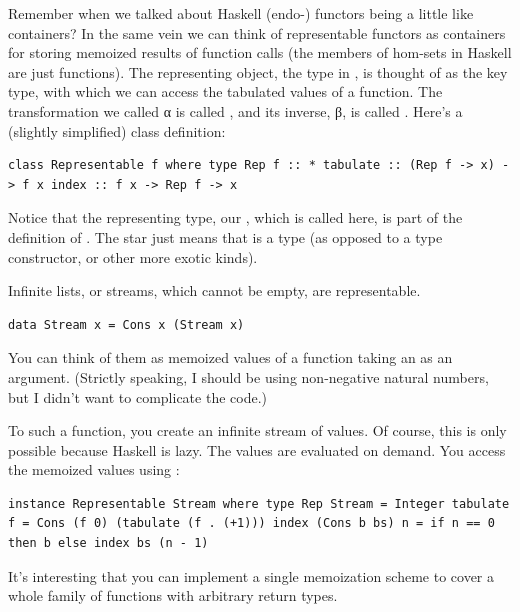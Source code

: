 Remember when we talked about Haskell (endo-) functors being a little
like containers? In the same vein we can think of representable functors
as containers for storing memoized results of function calls (the
members of hom-sets in Haskell are just functions). The representing
object, the type  in , is thought of as the
key type, with which we can access the tabulated values of a function.
The transformation we called α is called , and its
inverse, β, is called . Here's a (slightly simplified)
 class definition:

\begin{Verbatim}[commandchars=\\\{\}]
class Representable f where type Rep f :: * tabulate :: (Rep f -> x) -> f x index :: f x -> Rep f -> x
\end{Verbatim}

Notice that the representing type, our , which is called
 here, is part of the definition of
. The star just means that  is a
type (as opposed to a type constructor, or other more exotic kinds).

Infinite lists, or streams, which cannot be empty, are representable.

\begin{Verbatim}[commandchars=\\\{\}]
data Stream x = Cons x (Stream x)
\end{Verbatim}

You can think of them as memoized values of a function taking an
 as an argument. (Strictly speaking, I should be using
non-negative natural numbers, but I didn't want to complicate the code.)

To  such a function, you create an infinite stream of
values. Of course, this is only possible because Haskell is lazy. The
values are evaluated on demand. You access the memoized values using
:

\begin{Verbatim}[commandchars=\\\{\}]
instance Representable Stream where type Rep Stream = Integer tabulate f = Cons (f 0) (tabulate (f . (+1))) index (Cons b bs) n = if n == 0 then b else index bs (n - 1)
\end{Verbatim}

It's interesting that you can implement a single memoization scheme to
cover a whole family of functions with arbitrary return types.

